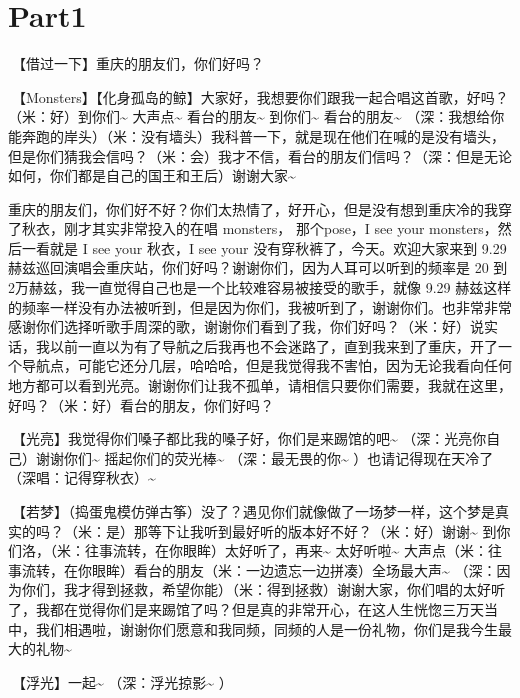 \documentclass[
]{book}
\begin{document}
\section{Part1}\label{chongqing-20241006-part1}

🎵【借过一下】重庆的朋友们，你们好吗？

🎵【Monsters】【化身孤岛的鲸】大家好，我想要你们跟我一起合唱这首歌，好吗？（米：好）到你们\textasciitilde{} 大声点\textasciitilde{} 看台的朋友\textasciitilde{} 到你们\textasciitilde{} 看台的朋友\textasciitilde{}
（深：我想给你能奔跑的岸头）（米：没有墙头）我科普一下，就是现在他们在喊的是没有墙头，但是你们猜我会信吗？（米：会）我才不信，看台的朋友们信吗？（深：但是无论如何，你们都是自己的国王和王后）谢谢大家\textasciitilde{}

重庆的朋友们，你们好不好？你们太热情了，好开心，但是没有想到重庆冷的我穿了秋衣，刚才其实非常投入的在唱 monsters， 那个pose，I see your monsters，然后一看就是 I see your 秋衣，I see your 没有穿秋裤了，今天。欢迎大家来到 9.29 赫兹巡回演唱会重庆站，你们好吗？谢谢你们，因为人耳可以听到的频率是 20 到2万赫兹，我一直觉得自己也是一个比较难容易被接受的歌手，就像 9.29 赫兹这样的频率一样没有办法被听到，但是因为你们，我被听到了，谢谢你们。也非常非常感谢你们选择听歌手周深的歌，谢谢你们看到了我，你们好吗？（米：好）说实话，我以前一直以为有了导航之后我再也不会迷路了，直到我来到了重庆，开了一个导航点，可能它还分几层，哈哈哈，但是我觉得我不害怕，因为无论我看向任何地方都可以看到光亮。谢谢你们让我不孤单，请相信只要你们需要，我就在这里，好吗？（米：好）看台的朋友，你们好吗？

🎵【光亮】我觉得你们嗓子都比我的嗓子好，你们是来踢馆的吧\textasciitilde{} （深：光亮你自己）谢谢你们\textasciitilde{} 摇起你们的荧光棒\textasciitilde{} （深：最无畏的你\textasciitilde{} ）也请记得现在天冷了（深唱：记得穿秋衣）\textasciitilde{}

🎵【若梦】（捣蛋鬼模仿弹古筝）没了？遇见你们就像做了一场梦一样，这个梦是真实的吗？（米：是）那等下让我听到最好听的版本好不好？（米：好）谢谢\textasciitilde{} 到你们洛，（米：往事流转，在你眼眸）太好听了，再来\textasciitilde{} 太好听啦\textasciitilde{} 大声点（米：往事流转，在你眼眸）看台的朋友（米：一边遗忘一边拼凑）全场最大声\textasciitilde{} （深：因为你们，我才得到拯救，希望你能）（米：得到拯救）谢谢大家，你们唱的太好听了，我都在觉得你们是来踢馆了吗？但是真的非常开心，在这人生恍惚三万天当中，我们相遇啦，谢谢你们愿意和我同频，同频的人是一份礼物，你们是我今生最大的礼物\textasciitilde{}

🎵【浮光】一起\textasciitilde{} （深：浮光掠影\textasciitilde{} ）
\end{document}
